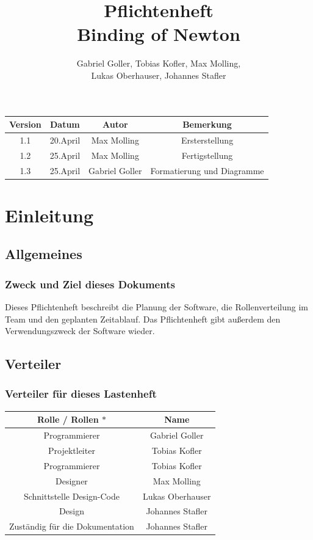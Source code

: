 \documentclass[12pt]{article}
\title{Pflichtenheft \\
Binding of Newton}
\author{Gabriel Goller, Tobias Kofler, Max Molling, \\
Lukas Oberhauser, Johannes Stafler}
\begin{document}
\begin{titlepage}
\maketitle
\end{titlepage}


\begin{center}
\begin{tabular}{ | c | c | c | c | } 
\hline
Version & Datum & Autor & Bemerkung\\ 
\hline
1.1 & 20.April & Max Molling & Ersterstellung\\ 
\hline
1.2 & 25.April & Max Molling & Fertigstellung\\ 
\hline
1.3 & 25.April & Gabriel Goller & Formatierung und Diagramme\\ 
\hline
\end{tabular}
\end{center}






\tableofcontents


\section{Einleitung}
\subsection{Allgemeines}
\subsubsection{Zweck und Ziel dieses Dokuments}
Dieses Pflichtenheft beschreibt die Planung der Software, die Rollenverteilung im Team und den geplanten Zeitablauf. Das Pflichtenheft gibt außerdem den Verwendungszweck der Software wieder. 

\subsection{Verteiler}
\subsubsection{Verteiler für dieses Lastenheft}


\begin{center}
\begin{tabular}{ | c | c | } 
\hline
Rolle / Rollen $\ast$ & Name \\
\hline
Programmierer & Gabriel Goller \\
\hline
Projektleiter & Tobias Kofler \\
\hline
Programmierer & Tobias Kofler \\
\hline
Designer & Max Molling \\
\hline
Schnittstelle Design-Code & Lukas Oberhauser \\
\hline
Design & Johannes Stafler \\
\hline
Zuständig für die Dokumentation & Johannes Stafler \\
\hline
\end{tabular}
\end{center}
\end{document}
